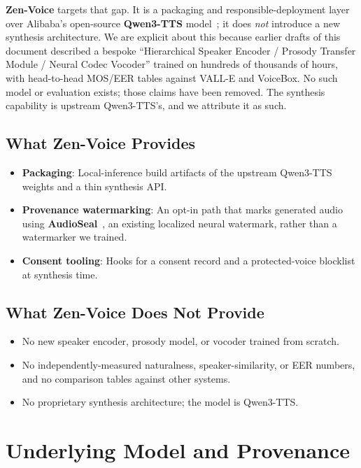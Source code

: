 \documentclass[11pt,a4paper]{article}
\begin{document}
\textbf{Zen-Voice} targets that gap. It is a packaging and responsible-deployment
layer over Alibaba's open-source \textbf{Qwen3-TTS} model~\citep{qwen3tts}; it does
\emph{not} introduce a new synthesis architecture. We are explicit about this because
earlier drafts of this document described a bespoke ``Hierarchical Speaker Encoder /
Prosody Transfer Module / Neural Codec Vocoder'' trained on hundreds of thousands of
hours, with head-to-head MOS/EER tables against VALL-E and VoiceBox. No such model or
evaluation exists; those claims have been removed. The synthesis capability is
upstream Qwen3-TTS's, and we attribute it as such.

\subsection{What Zen-Voice Provides}
\begin{itemize}
    \item \textbf{Packaging}: Local-inference build artifacts of the upstream
          Qwen3-TTS weights and a thin synthesis API.
    \item \textbf{Provenance watermarking}: An opt-in path that marks generated audio
          using \textbf{AudioSeal}~\citep{san2024proactive}, an existing localized
          neural watermark, rather than a watermarker we trained.
    \item \textbf{Consent tooling}: Hooks for a consent record and a protected-voice
          blocklist at synthesis time.
\end{itemize}

\subsection{What Zen-Voice Does Not Provide}
\begin{itemize}
    \item No new speaker encoder, prosody model, or vocoder trained from scratch.
    \item No independently-measured naturalness, speaker-similarity, or EER numbers,
          and no comparison tables against other systems.
    \item No proprietary synthesis architecture; the model is Qwen3-TTS.
\end{itemize}

\section{Underlying Model and Provenance}
\label{sec:background}
\end{document}
